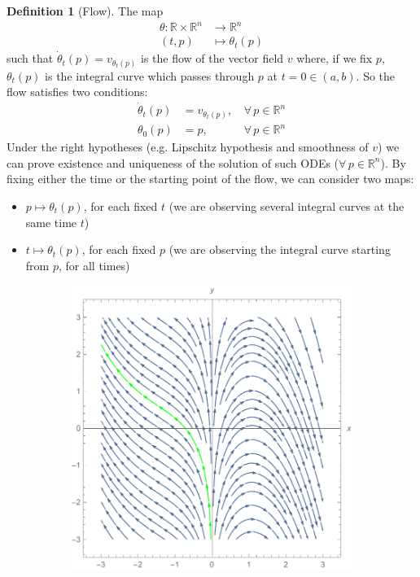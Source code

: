 \documentclass[a4paper,11pt,titlepage, article, oneside]{memoir}
\numberwithin{equation}{section}
\theoremstyle{definition}
\newtheorem{definition}[theorem]{Definition}
\theoremstyle{remark}
\newcommand{\rfield}{\mathbb{R}}
\begin{document}
\begin{definition}[Flow]
  The map
  \begin{align}
    \theta \colon \rfield \times \rfield^n &\rightarrow \rfield^n \\
    (t, p) &\mapsto \theta_t(p) \nonumber
  \end{align}
  such that $\dot\theta_t(p) = v_{\theta_t(p)}$ is the flow of the vector field $v$ where, if we fix $p$, $\theta_t(p)$ is the integral curve which passes through $p$ at $t=0 \in (a, b)$.
  So the flow satisfies two conditions:
  \begin{align}
    \dot\theta_t(p) &= v_{\theta_t(p)} , \, &\forall \, p \in \rfield^n \\
    \theta_0(p) &= p, \, &\forall \, p \in \rfield^n
  \end{align}
Under the right hypotheses (e.g. Lipschitz hypothesis and smoothness of $v$) we can prove existence and uniqueness of the solution of such ODEs ($\forall\, p \in \rfield^n$).
By fixing either the time or the starting point of the flow, we can consider two maps:
\begin{itemize}
\item $p \mapsto \theta_t(p)$, for each fixed $t$ (we are observing several integral curves at the same time $t$)
\item $t \mapsto \theta_t(p)$, for each fixed $p$ (we are observing the integral curve starting from $p$, for all times)
\end{itemize}
\begin{figure}[H]
\centering
\begin{subfigure}{.48\textwidth}
     \centering
     \includegraphics[width=\linewidth]{Images/integralcurve_1.pdf}

\end{subfigure}
\end{figure}
\end{definition}
\end{document}
